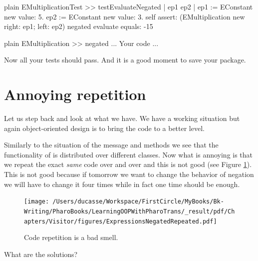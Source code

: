 \documentclass[10pt,twoside,english]{_support/latex/sbabook/sbabook}
\begin{document}
\begin{displaycode}{plain}
EMultiplicationTest >> testEvaluateNegated
	| ep1 ep2 |
	ep1 := EConstant new value: 5.
	ep2 := EConstant new value: 3.
	self assert: (EMultiplication new right: ep1; left: ep2) negated evaluate equals: -15
\end{displaycode}

\begin{displaycode}{plain}
EMultiplication >> negated
	... Your code ...
\end{displaycode}

Now all your tests should pass. And it is a good moment to save your package. 
\section{Annoying repetition}
Let us step back and look at what we have. We have a working situation but again object-oriented design is to bring the code to a better level. 

Similarly to the situation of the  message and methods we see that the functionality of  is distributed over 
different classes. Now what is annoying is that we repeat the exact \textit{same} code over and over and this is not good (see Figure \ref{fig:ExpressionsNegatedRepeated}). 
This is not good because if tomorrow we want to change the behavior of negation we will have to change it four times while 
in fact one time should be enough. 


\begin{figure}

\begin{center}
\texttt{[image: /Users/ducasse/Workspace/FirstCircle/MyBooks/Bk-Writing/PharoBooks/LearningOOPWithPharoTrans/\_result/pdf/Chapters/Visitor/figures/ExpressionsNegatedRepeated.pdf]}\caption{Code repetition is a bad smell.\label{fig:ExpressionsNegatedRepeated}}\end{center}
\end{figure}


What are the solutions?
\end{document}
